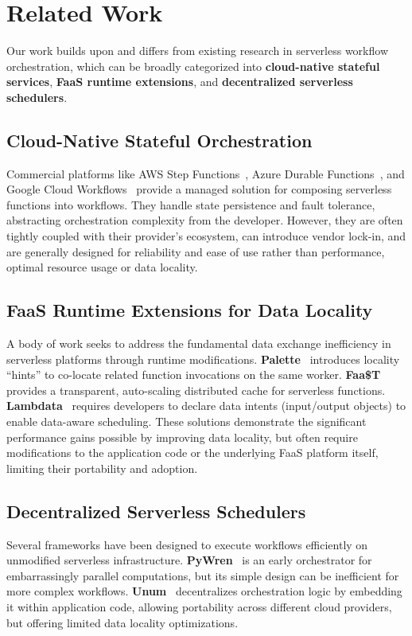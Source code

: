 \documentclass[conference]{IEEEtran}
\begin{document}

\section{Related Work}
\label{s:related_work}

Our work builds upon and differs from existing research in serverless workflow orchestration, which can be broadly categorized into \textbf{cloud-native stateful services}, \textbf{FaaS runtime extensions}, and \textbf{decentralized serverless schedulers}.

\subsection{Cloud-Native Stateful Orchestration}
Commercial platforms like AWS Step Functions~\cite{aws_step_functions}, Azure Durable Functions~\cite{azure_durable_functions}, and Google Cloud Workflows~\cite{google_cloud_workflows} provide a managed solution for composing serverless functions into workflows. They handle state persistence and fault tolerance, abstracting orchestration complexity from the developer. However, they are often tightly coupled with their provider's ecosystem, can introduce vendor lock-in, and are generally designed for reliability and ease of use rather than performance, optimal resource usage or data locality.

\subsection{FaaS Runtime Extensions for Data Locality}
A body of work seeks to address the fundamental data exchange inefficiency in serverless platforms through runtime modifications. \textbf{Palette}~\cite{palette_load_balancing} introduces locality ``hints'' to co-locate related function invocations on the same worker. \textbf{Faa\$T}~\cite{faast_caching} provides a transparent, auto-scaling distributed cache for serverless functions. \textbf{Lambdata}~\cite{lambdata_intents} requires developers to declare data intents (input/output objects) to enable data-aware scheduling. These solutions demonstrate the significant performance gains possible by improving data locality, but often require modifications to the application code or the underlying FaaS platform itself, limiting their portability and adoption.

\subsection{Decentralized Serverless Schedulers}
Several frameworks have been designed to execute workflows efficiently on unmodified serverless infrastructure. \textbf{PyWren}~\cite{pywren} is an early orchestrator for embarrassingly parallel computations, but its simple design can be inefficient for more complex workflows. \textbf{Unum}~\cite{unum_decentralized_orchestrator} decentralizes orchestration logic by embedding it within application code, allowing portability across different cloud providers, but offering limited data locality optimizations.
\end{document}
